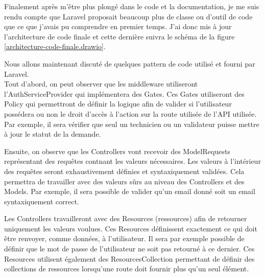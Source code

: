 \documentclass[
    iai, %
    il, %
]{heig-tb}
\begin{document}

Finalement après m'être plus plongé dans le code et la documentation, je me suis rendu compte que
Laravel proposait beaucoup plus de classe ou d'outil de code que ce que j'avais pu comprendre en
premier temps. J'ai donc mis à jour l'architecture de code finale et cette dernière suivra le schéma
de la figure \ref{architecture-code-finale.drawio}.

Nous allons maintenant discuté de quelques pattern de code utilisé et fourni par Laravel.\\
Tout d'abord, on peut observer que les middleware utiliseront l'AuthServiceProvider qui
implémentera des Gates. Ces Gates utiliseront des Policy qui permettront de définir la logique afin
de valider si l'utilisateur possédera ou non le droit d'accès à l'action sur la route utilisée de
l'API utilisée. Par exemple, il sera vérifier que seul un technicien ou un validateur puisse mettre
à jour le statut de la demande.

Ensuite, on observe que les Controllers vont recevoir des ModelRequests représentant des requêtes
contnant les valeurs nécessaires. Les valeurs à l'intérieur des requêtes seront exhaustivement
définies et syntaxiquement validées. Cela permettra de travailler avec des valeurs sûrs au niveau
des Controllers et des Models. Par exemple, il sera possible de valider qu'un email donné soit un
email syntaxiquement correct.

Les Controllers travailleront avec des Resources (ressources) afin de retourner uniquement les
valeurs voulues. Ces Resources définissent exactement ce qui doit être renvoyer, comme données, à
l'utilisateur. Il sera par exemple possible de définir que le mot de passe de l'utilisateur ne soit
pas retourné à ce dernier. Ces Resources utilisent également des ResourcesCollection permettant de
définir des collections de ressources lorsqu'une route doit fournir plus qu'un seul élément.




\end{document}
